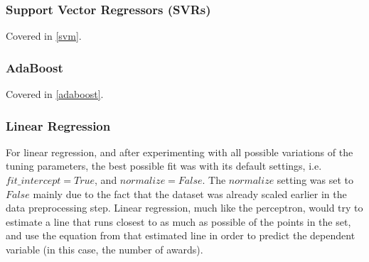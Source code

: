 \documentclass[journal,transmag]{IEEEtran}
\begin{document}
			\subsubsection{Support Vector Regressors (SVRs)}
			Covered in \ref{svm}.
			
			\subsubsection{AdaBoost}
			Covered in \ref{adaboost}.			
			
			\subsubsection{Linear Regression}
			For linear regression, and after experimenting with all possible variations of the tuning parameters, the best possible fit was with its default settings, i.e. $fit\_intercept=True$, and $normalize=False$. The $normalize$ setting was set to $False$ mainly due to the fact that the dataset was already scaled earlier in the data preprocessing step. Linear regression, much like the perceptron, would try to estimate a line that runs closest to as much as possible of the points in the set, and use the equation from that estimated line in order to predict the dependent variable (in this case, the number of awards).
	
\end{document}
